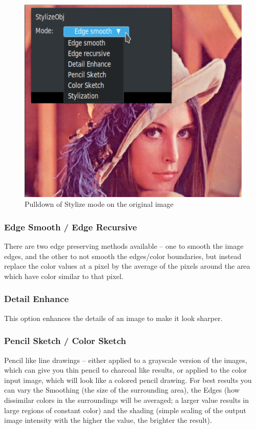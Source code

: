\begin{figure}[htpb]
    \centering
    \includegraphics[width=0.6\linewidth]{images/stylizeobj01.png}
    \caption{Pulldown of Stylize mode on the original image}
    \label{fig:stylizeobj01}
\end{figure}

\subsubsection*{Edge Smooth / Edge Recursive}%
\label{ssub:edge_smooth_recursive}

There are two edge preserving methods available -- one to smooth the image edges, and the other to not smooth the edges/color boundaries, but instead replace the color values at a pixel by the average of the pixels around the area which have color similar to that pixel.

\subsubsection*{Detail Enhance}%
\label{ssub:detail_enhance}

This option enhances the details of an image to make it look sharper.

\subsubsection*{Pencil Sketch / Color Sketch}%
\label{ssub:pencil_color_sketch}

Pencil like line drawings -- either applied to a grayscale version of the images, which can give you thin pencil to charcoal like results, or applied to the color input image, which will look like a colored pencil drawing. For best results you can vary the Smoothing (the size of the surrounding area), the Edges (how dissimilar colors in the surroundings will be averaged; a larger value results in large regions of constant color) and the shading (simple scaling of the output image intensity with the higher the value, the brighter the result).

